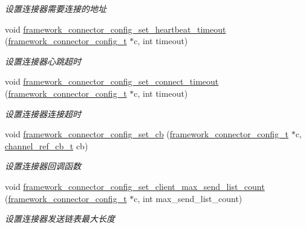 \begin{DoxyCompactItemize}
\begin{DoxyCompactList}\small\item\em 设置连接器需要连接的地址 \end{DoxyCompactList}\item 
void \hyperlink{a00104_ga15e1d8ef32fcc99dcc9c35383fa5dbc8_ga15e1d8ef32fcc99dcc9c35383fa5dbc8}{framework\+\_\+connector\+\_\+config\+\_\+set\+\_\+heartbeat\+\_\+timeout} (\hyperlink{a00051_a81253f4c995b97e69be0e67f7a26097f_a81253f4c995b97e69be0e67f7a26097f}{framework\+\_\+connector\+\_\+config\+\_\+t} $\ast$c, int timeout)
\begin{DoxyCompactList}\small\item\em 设置连接器心跳超时 \end{DoxyCompactList}\item 
void \hyperlink{a00104_ga59a35df5173a2f94e5b743fbeeb48f6b_ga59a35df5173a2f94e5b743fbeeb48f6b}{framework\+\_\+connector\+\_\+config\+\_\+set\+\_\+connect\+\_\+timeout} (\hyperlink{a00051_a81253f4c995b97e69be0e67f7a26097f_a81253f4c995b97e69be0e67f7a26097f}{framework\+\_\+connector\+\_\+config\+\_\+t} $\ast$c, int timeout)
\begin{DoxyCompactList}\small\item\em 设置连接器连接超时 \end{DoxyCompactList}\item 
void \hyperlink{a00104_gaaa7b13871a9aca1dbb5ebfe1ece2dde8_gaaa7b13871a9aca1dbb5ebfe1ece2dde8}{framework\+\_\+connector\+\_\+config\+\_\+set\+\_\+cb} (\hyperlink{a00051_a81253f4c995b97e69be0e67f7a26097f_a81253f4c995b97e69be0e67f7a26097f}{framework\+\_\+connector\+\_\+config\+\_\+t} $\ast$c, \hyperlink{a00051_ae296ec4d1ce108960de8dcc423956a1d_ae296ec4d1ce108960de8dcc423956a1d}{channel\+\_\+ref\+\_\+cb\+\_\+t} cb)
\begin{DoxyCompactList}\small\item\em 设置连接器回调函数 \end{DoxyCompactList}\item 
void \hyperlink{a00104_ga0afe3e1f2612f39667940fc336312cb9_ga0afe3e1f2612f39667940fc336312cb9}{framework\+\_\+connector\+\_\+config\+\_\+set\+\_\+client\+\_\+max\+\_\+send\+\_\+list\+\_\+count} (\hyperlink{a00051_a81253f4c995b97e69be0e67f7a26097f_a81253f4c995b97e69be0e67f7a26097f}{framework\+\_\+connector\+\_\+config\+\_\+t} $\ast$c, int max\+\_\+send\+\_\+list\+\_\+count)
\begin{DoxyCompactList}\small\item\em 设置连接器发送链表最大长度 \end{DoxyCompactList}\item 

\end{DoxyCompactItemize}
